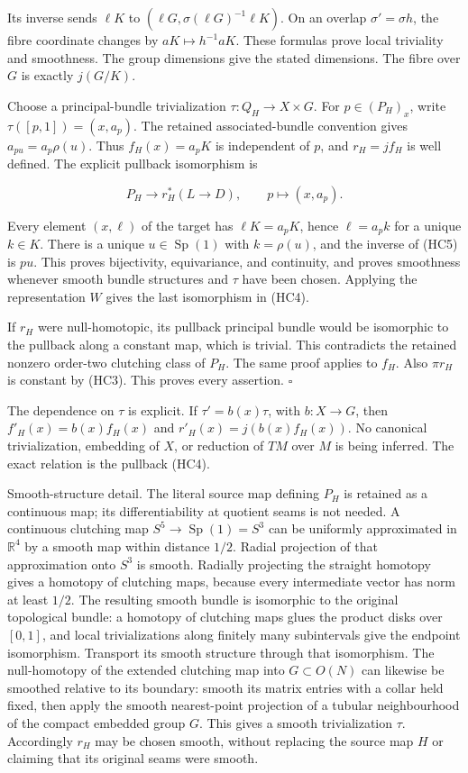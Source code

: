 \documentclass[11pt]{article}
\begin{document}
Its inverse sends \(\ell K\) to
\((\ell G,\sigma(\ell G)^{-1}\ell K)\). On an overlap
\(\sigma'=\sigma h\), the fibre coordinate changes by \(aK\mapsto h^{-1}aK\).
These formulas prove local triviality and smoothness. The group dimensions
give the stated dimensions. The fibre over \(G\) is exactly \(j(G/K)\).

Choose a principal-bundle trivialization
\(\tau:Q_H\to X\times G\). For \(p\in(P_H)_x\), write
\(\tau([p,1])=(x,a_p)\). The retained associated-bundle convention gives
\(a_{pu}=a_p\rho(u)\). Thus \(f_H(x)=a_pK\) is independent of \(p\),
and \(r_H=jf_H\) is well defined. The explicit pullback isomorphism is

\[
 P_H\longrightarrow r_H^*(L\to D),\qquad
 p\longmapsto(x,a_p).
 \tag{HC5}
\]

Every element \((x,\ell)\) of the target has \(\ell K=a_pK\), hence
\(\ell=a_p k\) for a unique \(k\in K\). There is a unique \(u\in\operatorname{Sp}(1)\)
with \(k=\rho(u)\), and the inverse of (HC5) is \(pu\). This proves
bijectivity, equivariance, and continuity, and proves smoothness whenever
smooth bundle structures and \(\tau\) have been chosen. Applying the
representation \(W\) gives the last isomorphism in (HC4).

If \(r_H\) were null-homotopic, its pullback principal bundle would be
isomorphic to the pullback along a constant map, which is trivial. This
contradicts the retained nonzero order-two clutching class of \(P_H\).
The same proof applies to \(f_H\). Also \(\pi r_H\) is constant by (HC3).
This proves every assertion. \(\square\)

The dependence on \(\tau\) is explicit. If
\(\tau'=b(x)\tau\), with \(b:X\to G\), then
\(f'_H(x)=b(x)f_H(x)\) and \(r'_H(x)=j(b(x)f_H(x))\). No canonical
trivialization, embedding of \(X\), or reduction of \(TM\) over \(M\)
is being inferred. The exact relation is the pullback (HC4).

Smooth-structure detail. The literal source map defining \(P_H\) is
retained as a continuous map; its differentiability at quotient seams is
not needed. A continuous clutching map \(S^5\to\operatorname{Sp}(1)=S^3\)
can be uniformly approximated in \(\mathbb R^4\) by a smooth map within
distance \(1/2\). Radial projection of that approximation onto \(S^3\)
is smooth. Radially projecting the straight homotopy gives a homotopy
of clutching maps, because every intermediate vector has norm at least
\(1/2\). The resulting smooth bundle is isomorphic to the original
topological bundle: a homotopy of clutching maps glues the product disks
over \([0,1]\), and local trivializations along finitely many subintervals
give the endpoint isomorphism. Transport its smooth structure through
that isomorphism. The null-homotopy of the extended clutching map into
\(G\subset O(N)\) can likewise be smoothed relative to its boundary:
smooth its matrix entries with a collar held fixed, then apply the smooth
nearest-point projection of a tubular neighbourhood of the compact
embedded group \(G\). This gives a smooth trivialization \(\tau\).
Accordingly \(r_H\) may be chosen smooth, without replacing the source
map \(H\) or claiming that its original seams were smooth.
\end{document}
